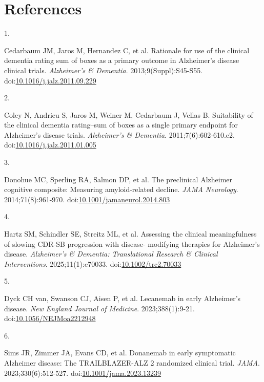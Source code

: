 \documentclass[
  11pt,
]{article}
\newlength{\cslhangindent}
\newlength{\csllabelwidth}
\newenvironment{CSLReferences}[2] %
 {\begin{list}{}{%
  \setlength{\itemindent}{0pt}
  \setlength{\leftmargin}{0pt}
  \setlength{\parsep}{0pt}
  \ifodd #1
   \setlength{\leftmargin}{\cslhangindent}
   \setlength{\itemindent}{-1\cslhangindent}
  \fi
  \setlength{\itemsep}{#2\baselineskip}}}
 {\end{list}}
\newcommand{\CSLLeftMargin}[1]{\parbox[t]{\csllabelwidth}{\strut#1\strut}}
\newcommand{\CSLRightInline}[1]{\parbox[t]{\linewidth - \csllabelwidth}{\strut#1\strut}}
\begin{document}
\section*{References}\label{references}

\protect{}\label{refs}
\begin{CSLReferences}{0}{1}
\CSLLeftMargin{1. }%
\CSLRightInline{Cedarbaum JM, Jaros M, Hernandez C, et al. Rationale for use of the clinical dementia rating sum of boxes as a primary outcome in {Alzheimer's} disease clinical trials. \emph{Alzheimer's \& Dementia}. 2013;9(Suppl):S45-S55. doi:\href{https://doi.org/10.1016/j.jalz.2011.09.229}{10.1016/j.jalz.2011.09.229}}

\CSLLeftMargin{2. }%
\CSLRightInline{Coley N, Andrieu S, Jaros M, Weiner M, Cedarbaum J, Vellas B. Suitability of the clinical dementia rating--sum of boxes as a single primary endpoint for {Alzheimer's} disease trials. \emph{Alzheimer's \& Dementia}. 2011;7(6):602-610.e2. doi:\href{https://doi.org/10.1016/j.jalz.2011.01.005}{10.1016/j.jalz.2011.01.005}}

\CSLLeftMargin{3. }%
\CSLRightInline{Donohue MC, Sperling RA, Salmon DP, et al. The preclinical {Alzheimer} cognitive composite: Measuring amyloid-related decline. \emph{JAMA Neurology}. 2014;71(8):961-970. doi:\href{https://doi.org/10.1001/jamaneurol.2014.803}{10.1001/jamaneurol.2014.803}}

\CSLLeftMargin{4. }%
\CSLRightInline{Hartz SM, Schindler SE, Streitz ML, et al. Assessing the clinical meaningfulness of slowing {CDR-SB} progression with disease- modifying therapies for {Alzheimer's} disease. \emph{Alzheimer's \& Dementia: Translational Research \& Clinical Interventions}. 2025;11(1):e70033. doi:\href{https://doi.org/10.1002/trc2.70033}{10.1002/trc2.70033}}

\CSLLeftMargin{5. }%
\CSLRightInline{{Dyck CH van, Swanson CJ, Aisen P, et al.} Lecanemab in early {Alzheimer's} disease. \emph{New England Journal of Medicine}. 2023;388(1):9-21. doi:\href{https://doi.org/10.1056/NEJMoa2212948}{10.1056/NEJMoa2212948}}

\CSLLeftMargin{6. }%
\CSLRightInline{{Sims JR, Zimmer JA, Evans CD, et al.} Donanemab in early symptomatic {Alzheimer} disease: The {TRAILBLAZER-ALZ 2} randomized clinical trial. \emph{JAMA}. 2023;330(6):512-527. doi:\href{https://doi.org/10.1001/jama.2023.13239}{10.1001/jama.2023.13239}}


\end{CSLReferences}
\end{document}
